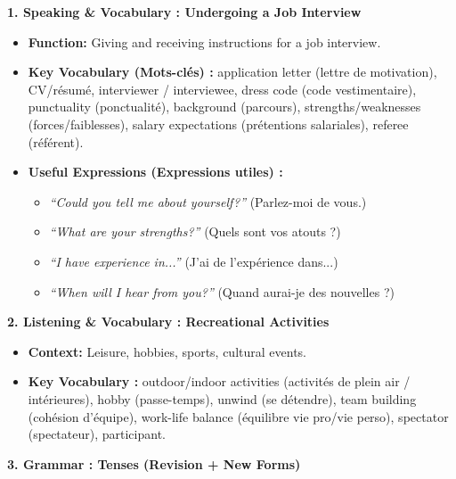 \documentclass[11pt]{article}
\newcommand{\cle}[1]{{\popxbold\color{popdark}#1}}
\begin{document}
\begin{bilan}

\textbf{1. Speaking \& Vocabulary : Undergoing a Job Interview}
\begin{itemize}
  \item \textbf{Function:} Giving and receiving instructions for a job interview.
  \item \textbf{Key Vocabulary (Mots-clés) :} \cle{application letter} (lettre de motivation), \cle{CV/résumé}, \cle{interviewer} / \cle{interviewee}, \cle{dress code} (code vestimentaire), \cle{punctuality} (ponctualité), \cle{background} (parcours), \cle{strengths/weaknesses} (forces/faiblesses), \cle{salary expectations} (prétentions salariales), \cle{referee} (référent).
  \item \textbf{Useful Expressions (Expressions utiles) :}
  \begin{itemize}
    \item \emph{``Could you tell me about yourself?''} (Parlez-moi de vous.)
    \item \emph{``What are your strengths?''} (Quels sont vos atouts ?)
    \item \emph{``I have experience in...''} (J'ai de l'expérience dans...)
    \item \emph{``When will I hear from you?''} (Quand aurai-je des nouvelles ?)
  \end{itemize}
\end{itemize}

\textbf{2. Listening \& Vocabulary : Recreational Activities}
\begin{itemize}
  \item \textbf{Context:} Leisure, hobbies, sports, cultural events.
  \item \textbf{Key Vocabulary :} \cle{outdoor/indoor activities} (activités de plein air / intérieures), \cle{hobby} (passe-temps), \cle{unwind} (se détendre), \cle{team building} (cohésion d'équipe), \cle{work-life balance} (équilibre vie pro/vie perso), \cle{spectator} (spectateur), \cle{participant}.
\end{itemize}

\textbf{3. Grammar : Tenses (Revision + New Forms)}


\end{bilan}
\end{document}
